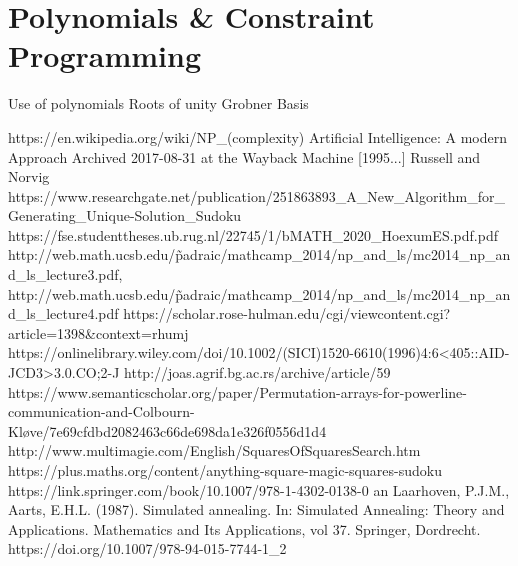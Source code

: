\documentclass[a4paper,12pt]{article}
\begin{document}
\section{Polynomials \& Constraint Programming}
	Use of polynomials
	Roots of unity
	Grobner Basis
\begin{thebibliography}{100}
	 https://en.wikipedia.org/wiki/NP\_(complexity)
	 Artificial Intelligence: A modern Approach Archived 2017-08-31 at the Wayback Machine [1995...] Russell and Norvig
	 https://www.researchgate.net/publication/251863893\_A\_New\_Algorithm\_for\_Generating\_Unique-Solution\_Sudoku
	 https://fse.studenttheses.ub.rug.nl/22745/1/bMATH\_2020\_HoexumES.pdf.pdf
	 http://web.math.ucsb.edu/\~padraic/mathcamp\_2014/np\_and\_ls/mc2014\_np\_and\_ls\_lecture3.pdf, http://web.math.ucsb.edu/\~padraic/mathcamp\_2014/np\_and\_ls/mc2014\_np\_and\_ls\_lecture4.pdf
	 https://scholar.rose-hulman.edu/cgi/viewcontent.cgi?article=1398\&context=rhumj
	 https://onlinelibrary.wiley.com/doi/10.1002/(SICI)1520-6610(1996)4:6<405::AID-JCD3>3.0.CO;2-J
	 http://joas.agrif.bg.ac.rs/archive/article/59
	 https://www.semanticscholar.org/paper/Permutation-arrays-for-powerline-communication-and-Colbourn-Kløve/7e69cfdbd2082463c66de698da1e326f0556d1d4
	 http://www.multimagie.com/English/SquaresOfSquaresSearch.htm
	 https://plus.maths.org/content/anything-square-magic-squares-sudoku
	 https://link.springer.com/book/10.1007/978-1-4302-0138-0
	an Laarhoven, P.J.M., Aarts, E.H.L. (1987). Simulated annealing. In: Simulated Annealing: Theory and Applications. Mathematics and Its Applications, vol 37. Springer, Dordrecht. https://doi.org/10.1007/978-94-015-7744-1\_2
\end{thebibliography}
\end{document}
